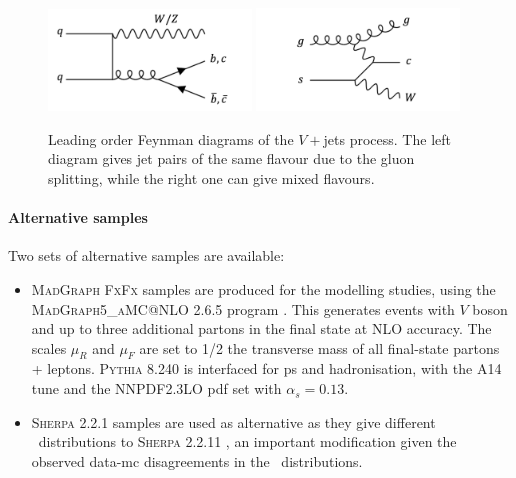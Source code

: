 \begin{figure}[h!]
  \center
  \includegraphics[width=0.48\textwidth]{Images/VH/Feynman/vjet.png}
  \includegraphics[width=0.48\textwidth]{Images/VH/Feynman/vjet2.png}
  \caption{Leading order Feynman diagrams of the $V+$jets process. The left diagram gives jet pairs of the same flavour due to the gluon splitting, while the right one can give mixed flavours.} 
  \label{fig:feynVJ}
\end{figure}

\paragraph{Alternative samples} Two sets of alternative samples are available:
\begin{itemize}
  \item \textsc{MadGraph FxFx} \cite{Frederix:2012ps} samples are produced for the modelling studies, using the \textsc{MadGraph5\_aMC@NLO} 2.6.5 program \cite{madgraph}. This generates events with $V$ boson and up to three additional partons in the final state at NLO accuracy. The scales $\mu_R$ and $\mu_F$ are set to 1/2 the transverse mass of all final-state partons + leptons. \textsc{Pythia} 8.240 is interfaced for \gls{ps} and hadronisation, with the A14 tune \cite{ATL-PHYS-PUB-2014-021} and the NNPDF2.3LO \gls{pdf} \cite{BALL2013244} set with $\alpha_s = 0.13$.
  \item \textsc{Sherpa} 2.2.1 \cite{sherpa2.2paper} samples are used as alternative as they give different \ptv\ distributions to \textsc{Sherpa} 2.2.11 \cite{simVjet}, an important modification given the observed data-\gls{mc} disagreements in the \ptv\ distributions.
\end{itemize}


